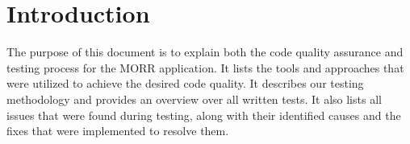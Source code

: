 \chapter{Introduction}

The purpose of this document is to explain both the code quality assurance and testing process for the MORR application. It lists the tools and approaches that were utilized to achieve the desired code quality. It describes our testing methodology and provides an overview over all written tests. It also lists all issues that were found during testing, along with their identified causes and the fixes that were implemented to resolve them.